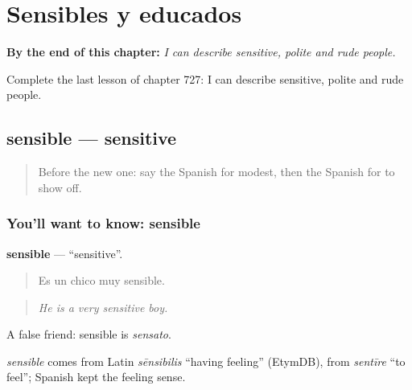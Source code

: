 
\chapter{Sensibles y educados}
\label{ch:es-sensibles-y-educados}

\begin{chapteropening}
\textbf{By the end of this chapter:} \emph{I can describe sensitive, polite and rude people.}

Complete the last lesson of chapter 727: I can describe sensitive, polite and rude people.
\end{chapteropening}

\section[sensible]{sensible — sensitive}

\label{lesson:ES-C727-sensible}



\begin{quote}
Before the new one: say the Spanish for modest, then the Spanish for to show off.
\end{quote}

\subsection*{You'll want to know: sensible}
\textbf{sensible} — \textquotedblleft{}sensitive\textquotedblright{}.

\begin{quote}
Es un chico muy sensible.
\end{quote}

\begin{quote}
\emph{He is a very sensitive boy.}
\end{quote}

A false friend: sensible is \emph{sensato}.

\begin{cousinweb}
\emph{sensible} comes from Latin \emph{sēnsibilis} \textquotedblleft{}having feeling\textquotedblright{} (EtymDB), from \emph{sentīre} \textquotedblleft{}to feel\textquotedblright{}; Spanish kept the feeling sense.
\end{cousinweb}

